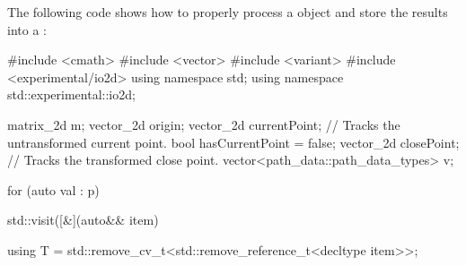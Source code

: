 \pnum
The following code shows how to properly process a  object  and store the results into a :

\begin{codeblock}
  #include <cmath>
  #include <vector>
  #include <variant>
  #include <experimental/io2d>
  using namespace std;
  using namespace std::experimental::io2d;
  
  matrix_2d m;
  vector_2d origin;
  vector_2d currentPoint; // Tracks the untransformed current point.
  bool hasCurrentPoint = false;
  vector_2d closePoint;   // Tracks the transformed close point.
  vector<path_data::path_data_types> v;
  
  for (auto val : p) {
    std::visit([&](auto&& item) {
      using T = std::remove_cv_t<std::remove_reference_t<decltype item>>;

}}
\end{codeblock}
